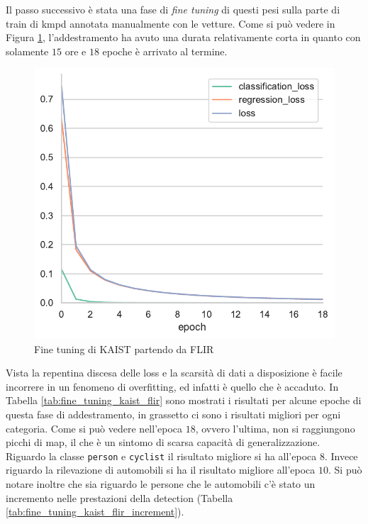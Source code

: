 Il passo successivo è stata una fase di \textit{fine tuning} di questi pesi sulla parte di train di \ac{kmpd} annotata manualmente con le vetture. Come si può vedere in Figura \ref{fig:fine_tuning_kaist_flir}, l'addestramento ha avuto una durata relativamente corta in quanto con solamente $15$ ore e $18$ epoche è arrivato al termine.
\begin{figure}[]
    \centering
    \includegraphics[width=\textwidth]{images/graphic/fine_tuning_kaist_flir.pdf}
    \caption{Fine tuning di KAIST partendo da FLIR}
    \label{fig:fine_tuning_kaist_flir}
\end{figure}
Vista la repentina discesa delle loss e la scarsità di dati a disposizione è facile incorrere in un fenomeno di overfitting, ed infatti è quello che è accaduto. In Tabella \ref{tab:fine_tuning_kaist_flir} sono mostrati i risultati per alcune epoche di questa fase di addestramento, in grassetto ci sono i risultati migliori per ogni categoria. Come si può vedere nell'epoca $18$, ovvero l'ultima, non si raggiungono picchi di \ac{map}, il che è un sintomo di scarsa capacità di generalizzazione. Riguardo la classe \texttt{person} e \texttt{cyclist} il risultato migliore si ha all'epoca $8$. Invece riguardo la rilevazione di automobili si ha il risultato migliore all'epoca $10$. Si può notare inoltre che sia riguardo le persone che le automobili c'è stato un incremento nelle prestazioni della detection (Tabella \ref{tab:fine_tuning_kaist_flir_increment}). 
